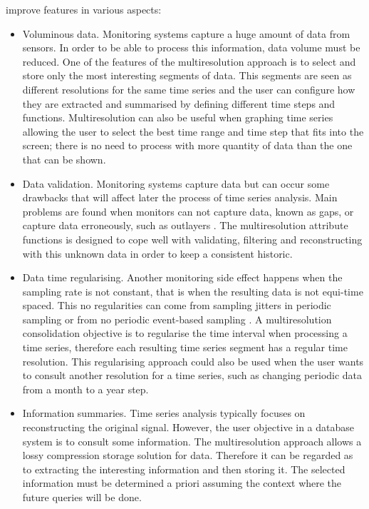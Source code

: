 improve  features in various aspects:
\begin{itemize}

\item Voluminous data. Monitoring systems capture a huge amount of
  data from sensors. In order to be able to process this information,
  data volume must be reduced. One of the features of the
  multiresolution approach is to select and store only the most
  interesting segments of data. This segments are seen as different
  resolutions for the same time series and the user can configure how
  they are extracted and summarised by defining different time steps
  and functions. Multiresolution can also be useful when graphing time
  series allowing the user to select the best time range and time
  step that fits into the screen; there is no need to process with
  more quantity of data than the one that can be
  shown.%

\item Data validation. Monitoring systems capture data but can occur
  some drawbacks that will affect later the process of time series
  analysis. Main problems are found when monitors can not capture
  data, known as gaps, or capture data erroneously, such as outlayers
  \cite{quevedo10}.  The multiresolution attribute functions is
  designed to cope well with validating, filtering and reconstructing
  with this unknown data in order to keep a consistent
  historic.%

\item Data time regularising. Another monitoring side effect happens
  when the sampling rate is not constant, that is when the resulting
  data is not equi-time spaced. This no regularities can come from
  sampling jitters in periodic sampling or from no periodic
  event-based sampling \cite{kopetz11:realtime}. A multiresolution
  consolidation objective is to regularise the time interval when
  processing a time series, therefore each resulting time series
  segment has a regular time resolution. This regularising approach
  could also be used when the user wants to consult another resolution
  for a time series, such as changing periodic data from a month to a
  year step. %

\item Information summaries. Time series analysis typically focuses on
  reconstructing the original signal. However, the user objective in a
  database system is to consult some information. The multiresolution
  approach allows a lossy compression storage solution for data. Therefore
  it can be regarded as to extracting the interesting information and
  then storing it. The selected information must be determined a
  priori assuming the context where the future queries will be done.
\end{itemize}


